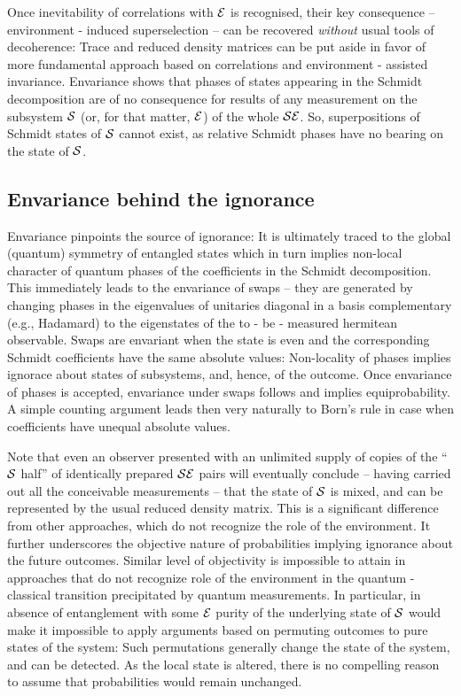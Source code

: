 \documentclass[aps,twocolumn,pra,epsfig]{revtex4}
\begin{document}
Once inevitability of correlations with ${\cal E}$ is recognised, their key
consequence -- environment - induced superselection -- can be recovered
{\it without} usual tools of decoherence: Trace and reduced density matrices
can be put aside in favor of more fundamental approach based on correlations
and environment - assisted invariance. Envariance shows that phases of states
appearing in the Schmidt decomposition are of no consequence for results of any
measurement on the subsystem ${\cal S}$ (or, for that matter, ${\cal E}$) of
the whole ${\cal SE}$. So, superpositions of Schmidt states of ${\cal S}$ cannot
exist, as relative Schmidt phases have no bearing on the state of ${\cal S}$.

\subsection{Envariance behind the ignorance}

Envariance pinpoints the source of ignorance: It is ultimately traced to
the global (quantum) symmetry of entangled states which in turn implies
non-local character of quantum phases of the coefficients in the Schmidt
decomposition. This immediately leads to the envariance of swaps -- they are
generated by changing phases in the eigenvalues of unitaries diagonal 
in a basis complementary (e.g., Hadamard) to the eigenstates of the 
to - be - measured hermitean observable. Swaps are envariant when 
the state is even and the corresponding Schmidt
coefficients have the same absolute values: Non-locality of phases implies
ignorace about states of subsystems, and, hence, of the outcome. Once
envariance of phases is accepted, envariance under swaps follows and implies
equiprobability. A simple counting argument leads then very naturally to Born's
rule in case when coefficients have unequal absolute values.

Note that even an observer presented with an unlimited supply of copies of the
``${\cal S}$ half'' of identically prepared ${\cal SE}$ pairs will eventually
conclude -- having carried out all the conceivable measurements -- that the state
of ${\cal S}$ is mixed, and can be represented by the usual reduced density
matrix. This is a significant difference from other approaches, which do not
recognize the role of the environment. It further underscores the objective
nature of probabilities implying ignorance about the future outcomes. Similar
level of objectivity  is impossible to attain in approaches that do not
recognize role of the environment in the quantum - classical transition
precipitated by quantum measurements. In particular, in absence of entanglement
with some ${\cal E}$ purity of the underlying state of ${\cal S}$ would make
it impossible to apply arguments based on permuting outcomes
to pure states of the system: Such permutations generally change the state
of the system, and can be detected. As the local state is altered, there is no
compelling reason to assume that probabilities would remain unchanged.
\end{document}
